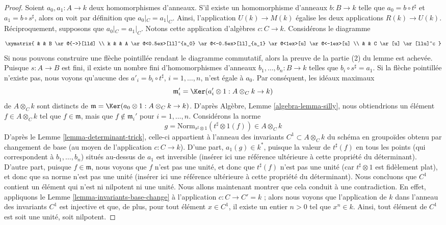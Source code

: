 \begin{proof}
\medskip\noindent
Soient $a_0, a_1 : A \to k$ deux homomorphismes d'anneaux. S'il existe un homomorphisme d'anneaux
$b : B \to k$ telle que $a_0 = b \circ t^\sharp$ et $a_1 = b \circ s^\sharp$,
alors on voit par définition que $a_0|_C = a_1|_C$. Ainsi, l'application
$U(k) \to M(k)$ égalise les deux applications $R(k) \to U(k)$.
Réciproquement, supposons que $a_0|_C = a_1|_C$. Notons cette application
d'algèbres $c : C \to k$. Considérons le diagramme
$$
\xymatrix{
& &
B \ar@{-->}[lld] \\
k & &
A
\ar@<0.5ex>[ll]^{a_0}
\ar@<-0.5ex>[ll]_{a_1}
\ar@<1ex>[u]
\ar@<-1ex>[u] \\
& &
C \ar[u] \ar[llu]^c
}
$$
Si nous pouvons construire une flèche pointillée rendant le diagramme commutatif, alors
la preuve de la partie (2) du lemme est achevée. Puisque $s : A \to B$ est fini,
il existe un nombre fini d'homomorphismes d'anneaux
$b_1, \ldots, b_n : B \to k$ telles que $b_i \circ s^\sharp = a_1$.
Si la flèche pointillée n'existe pas, nous voyons qu'aucune des
$a'_i = b_i \circ t^\sharp$, $i = 1, \ldots, n$, n'est égale à $a_0$.
Par conséquent, les idéaux maximaux
$$
\mathfrak m'_i = \Ker(a_i' \otimes 1 : A \otimes_C k \to k)
$$
de $A \otimes_C k$ sont distincts de
$\mathfrak m = \Ker(a_0 \otimes 1 : A \otimes_C k \to k)$.
D'après Algèbre, Lemme \ref{algebra-lemma-silly}, nous obtiendrions un élément
$f \in A \otimes_C k$ tel que $f \in \mathfrak m$, mais que
$f \not \in \mathfrak m_i'$ pour $i = 1, \ldots, n$.
Considérons la norme
$$
g = \text{Norm}_{s^\sharp \otimes 1}(t^\sharp \otimes 1(f))
\in
A \otimes_C k
$$
D'après le Lemme \ref{lemma-determinant-trick}, celle-ci appartient à l'anneau des invariants
$C^1 \subset A \otimes_C k$ du schéma en groupoïdes obtenu par
changement de base (au moyen de l'application $c : C \to k$). D'une part,
$a_1(g) \in k^*$, puisque
la valeur de $t^\sharp(f)$ en tous les points (qui correspondent à
$b_1, \ldots, b_n$) situés au-dessus de $a_1$ est
inversible (insérer ici une référence ultérieure à cette propriété du déterminant).
D'autre part, puisque $f \in \mathfrak m$, nous voyons que
$f$ n'est pas une unité, et donc que $t^\sharp(f)$ n'est pas une unité
(car $t^\sharp \otimes 1$ est fidèlement plat),
et donc que sa norme n'est pas une unité (insérer ici une référence ultérieure
à cette propriété du déterminant). Nous concluons que $C^1$ contient
un élément qui n'est ni nilpotent
ni une unité. Nous allons maintenant montrer que cela conduit à une contradiction.
En effet, appliquons le Lemme \ref{lemma-invariants-base-change}
à l'application $c : C \to C' = k$ ; alors
nous voyons que l'application de $k$ dans l'anneau des invariants $C^1$ est injective
et que, de plus, pour tout élément $x \in C^1$, il existe un entier
$n > 0$ tel que $x^n \in k$. Ainsi, tout élément de $C^1$ est
soit une unité, soit nilpotent.


\end{proof}

